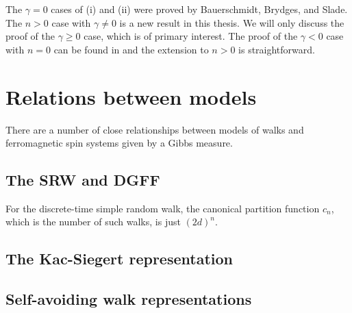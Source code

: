 The $\gamma = 0$ cases of (i) and (ii) were proved by Bauerschmidt, Brydges, and
Slade. The $n > 0$ case with $\gamma \ne 0$ is a new result in this thesis. We
will only discuss the proof of the $\gamma \ge 0$ case, which is of primary
interest. The proof of the $\gamma < 0$ case with $n = 0$ can be found in
\REF and the extension to $n > 0$ is straightforward.


\section{Relations between models}

There are a number of close relationships between models of walks and ferromagnetic spin
systems given by a Gibbs measure.


\subsection{The SRW and DGFF}


For the discrete-time simple random walk, the canonical partition function $c_n$,
which is the number of such walks, is just $(2 d)^n$.


\subsection{The Kac-Siegert representation}



\subsection{Self-avoiding walk representations}

